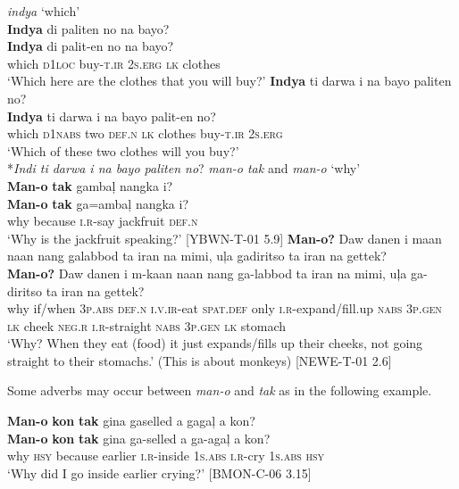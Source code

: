 \ea
\textit{indya} ‘which’ \\
\textbf{Indya}  di  paliten  no   na  bayo? \\\smallskip
\gll \textbf{Indya}  di  palit-en  no   na  bayo? \\
which  \textsc{d}1\textsc{loc}  buy-\textsc{t.ir}  2\textsc{s.erg}  \textsc{lk}  clothes \\
\glt ‘Which here are the clothes that you will buy?’
\z
\ea
\textbf{Indya}  ti  darwa  i  na  bayo  paliten  no? \\\smallskip
\gll \textbf{Indya}  ti  darwa  i  na  bayo  palit-en  no? \\
which  \textsc{d1nabs}  two  \textsc{def.n}  \textsc{lk}  clothes  buy-\textsc{t.ir}  2\textsc{s.erg} \\
\glt ‘Which of these two clothes will you buy?’ \\\smallskip
*\textit{Indi ti darwa i na bayo paliten no}?
\z
\ea
\textit{man-o tak} and \textit{man-o} ‘why’ \\
\textbf{Man-o}  \textbf{tak}  gambaļ  nangka  i? \\\smallskip
\gll \textbf{Man-o}  \textbf{tak}  ga=ambaļ  nangka  i? \\
why  because  \textsc{i.r}-say  jackfruit  \textsc{def.n} \\
\glt ‘Why is the jackfruit speaking?’ [YBWN-T-01 5.9]
\z
\ea
\textbf{Man-o?}  Daw  danen  i  maan  naan  nang  galabbod ta  iran  na  mimi,  uļa  gadiritso  ta  iran  na  gettek? \\\smallskip
\gll \textbf{Man-o?}  Daw  danen  i  m-kaan  naan  nang  ga-labbod ta  iran  na  mimi,  uļa  ga-diritso  ta  iran  na  gettek? \\
why  if/when  3\textsc{p.abs}  \textsc{def.n}  \textsc{i.v.ir}-eat  \textsc{spat.def}  only  \textsc{i.r}-expand/fill.up
\textsc{nabs}  3\textsc{p.gen}  \textsc{lk}  cheek  \textsc{neg.r}  \textsc{i.r}-straight  \textsc{nabs}  3\textsc{p.gen}  \textsc{lk}  stomach \\
\glt ‘Why? When they eat (food) it just expands/fills up their cheeks, not going straight to their stomachs.’ (This is  about monkeys) [NEWE-T-01 2.6]
\z

Some adverbs may occur between \textit{man-o} and \textit{tak} as in the following example.

\ea
\textbf{Man-o}  \textbf{kon}  \textbf{tak}  gina  gaselled  a  gagaļ  a  kon? \\\smallskip
\gll \textbf{Man-o}  \textbf{kon}  \textbf{tak}  gina  ga-selled  a  ga-agaļ  a  kon? \\
why  \textsc{hsy}  because  earlier  \textsc{i.r-}inside  1\textsc{s.abs}  \textsc{i.r}-cry  1\textsc{s.abs}  \textsc{hsy} \\
\glt ‘Why  did I go inside earlier crying?’ [BMON-C-06 3.15]
\z

